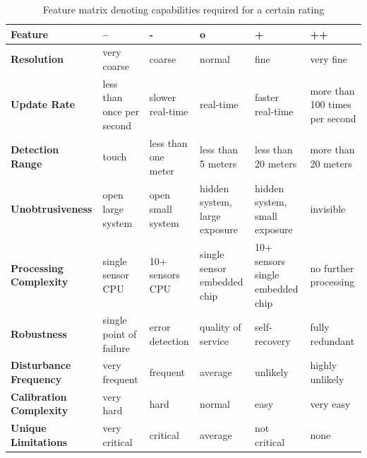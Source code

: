 \begin{table}[htbp]
  \centering
  \footnotesize
  \caption{Feature matrix denoting capabilities required for a certain rating}
    \begin{tabularx}{\linewidth}{XXXXXX}
    \toprule
    \textbf{Feature} & \textbf{--} & \textbf{-} & \textbf{o} & \textbf{+} & \textbf{++} \\
    \midrule
    \textbf{Resolution} & very coarse & coarse & normal & fine  & very fine \\
    \addlinespace
    \textbf{Update Rate} & less than once per second & slower real-time & real-time & faster real-time & more than 100 times per second \\
    \addlinespace
    \textbf{Detection Range} & touch & less than one meter & less than 5 meters & less than 20 meters & more than 20 meters \\
    \midrule
    \textbf{Unobtrusiveness} & open large system & open small system & hidden system, large exposure & hidden system, small exposure & invisible \\
    \addlinespace
    \textbf{Processing Complexity} & single sensor CPU & 10+ sensors CPU & single sensor embedded chip & 10+ sensors single embedded chip & no further processing \\
    \addlinespace
    \textbf{Robustness} & single point of failure & error detection & quality of service & self-recovery & fully redundant \\
    \midrule
    \textbf{Disturbance Frequency} & very frequent & frequent & average & unlikely & highly unlikely \\
    \addlinespace
    \textbf{Calibration Complexity} & very hard & hard  & normal & easy  & very easy \\
    \addlinespace
    \textbf{Unique Limitations} & very critical & critical & average & not critical  & none \\
    \bottomrule
    \end{tabularx}%
  \label{tab:bench_feature_matrix}%
\end{table}%

